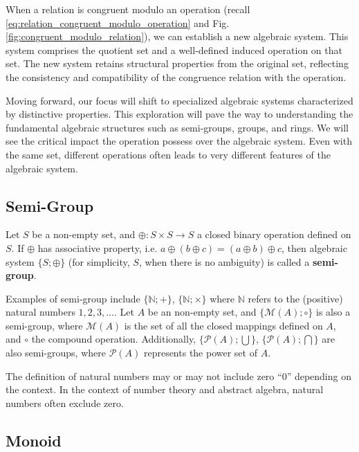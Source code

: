 When a relation is congruent modulo an operation (recall \eqref{eq:relation_congruent_modulo_operation} and Fig. \ref{fig:congruent_modulo_relation}), we can establish a new algebraic system. This system comprises the quotient set and a well-defined induced operation on that set. The new system retains structural properties from the original set, reflecting the consistency and compatibility of the congruence relation with the operation.

Moving forward, our focus will shift to specialized algebraic systems characterized by distinctive properties. This exploration will pave the way to understanding the fundamental algebraic structures such as semi-groups, groups, and rings. We will see the critical impact the operation possess over the algebraic system. Even with the same set, different operations often leads to very different features of the algebraic system.

\subsection{Semi-Group}

Let $S$ be a non-empty set, and $\oplus: S\times S \rightarrow S$ a closed binary operation defined on $S$. If $\oplus$ has associative property, i.e. $a\oplus(b\oplus c) = (a \oplus b) \oplus c$, then algebraic system $\{S; \oplus\}$ (for simplicity, $S$, when there is no ambiguity) is called a \textbf{semi-group}.

Examples of semi-group include $\{\mathbb{N}; +\}$, $\{\mathbb{N}; \times\}$ where $\mathbb{N}$ refers to the (positive) natural numbers $1, 2, 3, \ldots$. Let $A$ be an non-empty set, and $\{\mathcal{M}(A); \circ\}$ is also a semi-group, where $\mathcal{M}(A)$ is the set of all the closed mappings defined on $A$, and $\circ$ the compound operation. Additionally, $\{\mathcal{P}(A); \bigcup\}$, $\{\mathcal{P}(A); \bigcap\}$ are also semi-groups, where $\mathcal{P}(A)$ represents the power set of $A$.

\begin{shortbox}
The definition of natural numbers may or may not include zero ``$0$'' depending on the context. In the context of number theory and abstract algebra, natural numbers often exclude zero.
\end{shortbox}

\subsection{Monoid}

